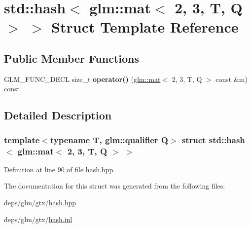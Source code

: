 \hypertarget{structstd_1_1hash_3_01glm_1_1mat_3_012_00_013_00_01T_00_01Q_01_4_01_4}{}\section{std\+:\+:hash$<$ glm\+:\+:mat$<$ 2, 3, T, Q $>$ $>$ Struct Template Reference}
\label{structstd_1_1hash_3_01glm_1_1mat_3_012_00_013_00_01T_00_01Q_01_4_01_4}
\subsection*{Public Member Functions}
\begin{DoxyCompactItemize}
\item 
\mbox{\label{structstd_1_1hash_3_01glm_1_1mat_3_012_00_013_00_01T_00_01Q_01_4_01_4_a30c289422606cd5a41070a41c1a37b42}} 
G\+L\+M\+\_\+\+F\+U\+N\+C\+\_\+\+D\+E\+CL size\+\_\+t {\bfseries operator()} (\hyperlink{structglm_1_1mat}{glm\+::mat}$<$ 2, 3, T, Q $>$ const \&m) const
\end{DoxyCompactItemize}


\subsection{Detailed Description}
\subsubsection*{template$<$typename T, glm\+::qualifier Q$>$\newline
struct std\+::hash$<$ glm\+::mat$<$ 2, 3, T, Q $>$ $>$}



Definition at line 90 of file hash.\+hpp.



The documentation for this struct was generated from the following files\+:\begin{DoxyCompactItemize}
\item 
deps/glm/gtx/\hyperlink{hash_8hpp}{hash.\+hpp}\item 
deps/glm/gtx/\hyperlink{hash_8inl}{hash.\+inl}\end{DoxyCompactItemize}
